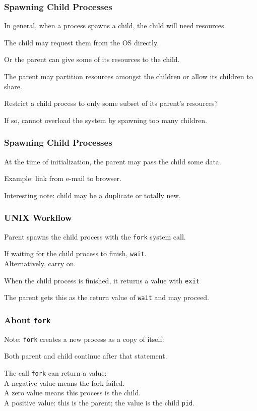 \begin{frame}
\frametitle{Spawning Child Processes}

In general, when a process spawns a child, the child will need resources. 

The child may request them from the OS directly.

Or the parent can give some of its resources to the child. 

The parent may partition resources amongst the children or allow its children to share.

Restrict a child process to only some subset of its parent's resources?

 If so, cannot overload the system by spawning too many children.

\end{frame}

\begin{frame}
\frametitle{Spawning Child Processes}

At the time of initialization, the parent may pass the child some data.

Example: link from e-mail to browser.

Interesting note: child may be a duplicate or totally new.

\end{frame}

\begin{frame}
\frametitle{UNIX Workflow}

Parent spawns the child process with the \texttt{fork} system call. 

If waiting for the child process to finish, \texttt{wait}.\\
\quad Alternatively, carry on.

When the child process is finished, it returns a value with \texttt{exit} 

The parent gets this as the return value of \texttt{wait} and may proceed.
\end{frame}

\begin{frame}
\frametitle{About \texttt{fork}}

Note: \texttt{fork} creates a new process as a copy of itself.

Both parent and child continue after that statement.

The call \texttt{fork} can return a value:\\
\quad A negative value means the fork failed.\\
\quad A zero value means this process is the child.\\
\quad A positive value: this is the parent; the value is the child \texttt{pid}.

\end{frame}

